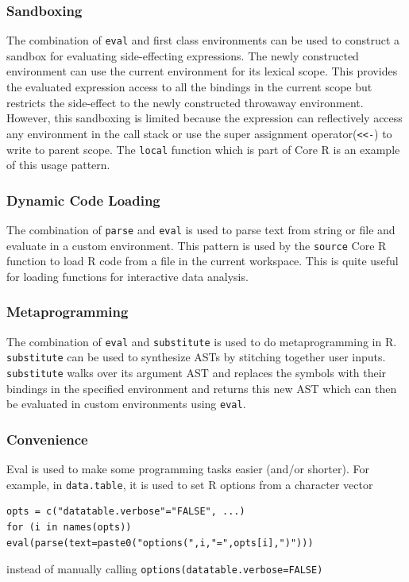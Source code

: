 \documentclass[USenglish,cleveref, autoref, thm-restate]{lipics-v2019}
\newcommand{\eval}{\texttt{eval}\xspace}
\renewcommand{\parse}{\c{parse}}
\newcommand{\source}{\c{source}}
\newcommand{\substitute}{\c{substitute}}
\renewcommand{\c}[1]{\lstinline{#1}\xspace}
\begin{document}
\subsubsection{Sandboxing} The combination of \eval and first class
environments can be used to construct a sandbox for evaluating
side-effecting expressions. The newly constructed environment can use the
current environment for its lexical scope. This provides the evaluated
expression access to all the bindings in the current scope but restricts the
side-effect to the newly constructed throwaway environment. However, this
sandboxing is limited because the expression can reflectively access any
environment in the call stack or use the super assignment operator(\c{<<-})
to write to parent scope. The \c{local} function which is part of Core R is
an example of this usage pattern.

\subsubsection{Dynamic Code Loading} The combination of \parse and \eval is
used to parse text from string or file and evaluate in a custom environment.
This pattern is used by the \source Core R function to load R code from a
file in the current workspace. This is quite useful for loading functions
for interactive data analysis.

\subsubsection{Metaprogramming} The combination of \eval and \substitute is
 used to do metaprogramming in R. \substitute can be used to synthesize ASTs
 by stitching together user inputs. \substitute walks over its argument AST
 and replaces the symbols with their bindings in the specified environment
 and returns this new AST which can then be evaluated in custom environments
 using \eval.

  \subsubsection{Convenience} Eval is used to make some programming tasks easier (and/or shorter). For example, in \c{data.table}, it is used to set R options from a character vector
  \begin{lstlisting}
opts = c("datatable.verbose"="FALSE", ...)
for (i in names(opts)) eval(parse(text=paste0("options(",i,"=",opts[i],")")))

  \end{lstlisting}
  instead of manually calling \c{options(datatable.verbose=FALSE)}
\end{document}
